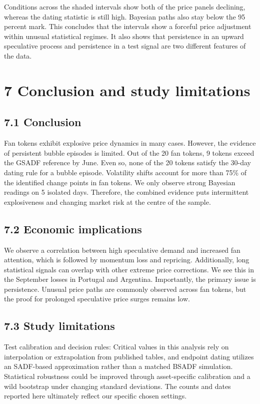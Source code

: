 \documentclass[11pt,a4paper,onecolumn]{article}
\begin{document}
Conditions across the shaded intervals show both of the price panels declining, whereas the dating statistic is still high. Bayesian paths also stay below the 95 percent mark. This concludes that the intervals show a forceful price adjustment within unusual statistical regimes. It also shows that persistence in an upward speculative process and persistence in a test signal are two different features of the data.

\section{7 Conclusion and study limitations}

\subsection{7.1 Conclusion}

Fan tokens exhibit explosive price dynamics in many cases. However, the evidence of persistent bubble episodes is limited. Out of the 20 fan tokens, 9 tokens exceed the GSADF reference by June. Even so, none of the 20 tokens satisfy the 30-day dating rule for a bubble episode. Volatility shifts account for more than 75\% of the identified change points in fan tokens. We only observe strong Bayesian readings on 5 isolated days. Therefore, the combined evidence puts intermittent explosiveness and changing market risk at the centre of the sample.

\subsection{7.2 Economic implications}

We observe a correlation between high speculative demand and increased fan attention, which is followed by momentum loss and repricing. Additionally, long statistical signals can overlap with other extreme price corrections. We see this in the September losses in Portugal and Argentina. Importantly, the primary issue is persistence. Unusual price paths are commonly observed across fan tokens, but the proof for prolonged speculative price surges remains low.

\subsection{7.3 Study limitations}

Test calibration and decision rules: Critical values in this analysis rely on interpolation or extrapolation from published tables, and endpoint dating utilizes an SADF-based approximation rather than a matched BSADF simulation. Statistical robustness could be improved through asset-specific calibration and a wild bootstrap under changing standard deviations. The counts and dates reported here ultimately reflect our specific chosen settings.
\end{document}
